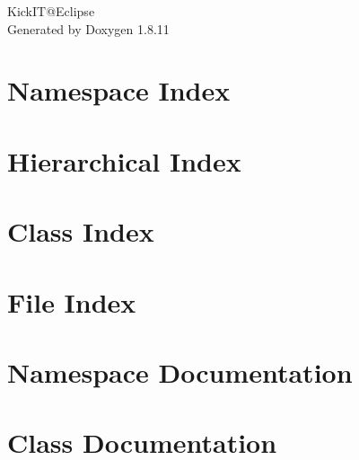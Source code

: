 \documentclass[twoside]{book}
\newcommand{\+}{\discretionary{\mbox{\scriptsize$\hookleftarrow$}}{}{}}
\newcommand{\clearemptydoublepage}{%
  \newpage{\pagestyle{empty}\cleardoublepage}%
}
\begin{document}
\hypersetup{pageanchor=false,
             bookmarksnumbered=true,
             pdfencoding=unicode
            }
\begin{titlepage}
\vspace*{7cm}
\begin{center}%
{\Large Kick\+IT@Eclipse }\\
\vspace*{1cm}
{\large Generated by Doxygen 1.8.11}\\
\end{center}
\end{titlepage}
\clearemptydoublepage
\tableofcontents
\clearemptydoublepage
{}
\hypersetup{pageanchor=true}

\chapter{Namespace Index}

\chapter{Hierarchical Index}

\chapter{Class Index}

\chapter{File Index}

\chapter{Namespace Documentation}

\chapter{Class Documentation}
































\end{document}

